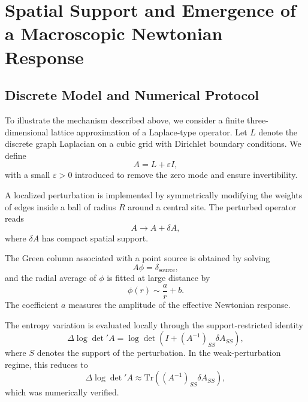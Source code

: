 \section{Spatial Support and Emergence of a Macroscopic Newtonian Response}

  \subsection{Discrete Model and Numerical Protocol}

    To illustrate the mechanism described above, we consider a finite
    three-dimensional lattice approximation of a Laplace-type operator.
    Let $L$ denote the discrete graph Laplacian on a cubic grid
    with Dirichlet boundary conditions.
    We define
    \begin{equation}
      A = L + \varepsilon I,
    \end{equation}
    with a small $\varepsilon > 0$ introduced to remove the zero mode
    and ensure invertibility.

    A localized perturbation is implemented by symmetrically modifying
    the weights of edges inside a ball of radius $R$ around a central site.
    The perturbed operator reads
    \begin{equation}
      A \longrightarrow A + \delta A,
    \end{equation}
    where $\delta A$ has compact spatial support.

    The Green column associated with a point source is obtained by solving
    \begin{equation}
      A \phi = \delta_{\mathrm{source}},
    \end{equation}
    and the radial average of $\phi$ is fitted at large distance by
    \begin{equation}
      \phi(r) \sim \frac{a}{r} + b.
    \end{equation}
    The coefficient $a$ measures the amplitude of the effective
    Newtonian response.

    The entropy variation is evaluated locally through the
    support-restricted identity
    \begin{equation}
      \Delta \log \det{}' A
      =
      \log \det (I + (A^{-1})_{SS} \delta A_{SS}),
    \end{equation}
    where $S$ denotes the support of the perturbation.
    In the weak-perturbation regime, this reduces to
    \begin{equation}
      \Delta \log \det{}' A
      \approx
      \mathrm{Tr}((A^{-1})_{SS} \delta A_{SS}),
    \end{equation}
    which was numerically verified.

